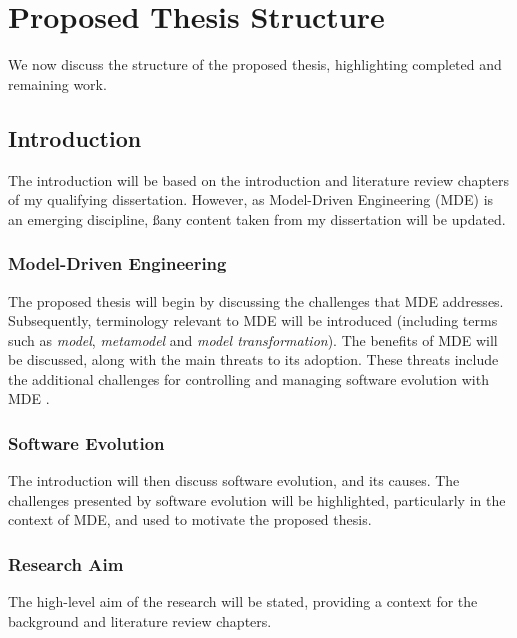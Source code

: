 

\section{Proposed Thesis Structure}
We now discuss the structure of the proposed thesis, highlighting completed and remaining work.


\subsection{Introduction}
The introduction will be based on the introduction and literature review chapters of my qualifying dissertation. However, as Model-Driven Engineering (MDE) is an emerging discipline, ßany content taken from my dissertation will be updated.

\subsubsection{Model-Driven Engineering}
The proposed thesis will begin by discussing the challenges that MDE addresses. Subsequently, terminology relevant to MDE will be introduced (including terms such as \emph{model}, \emph{metamodel} and \emph{model transformation}). The benefits of MDE will be discussed, along with the main threats to its adoption. These threats include the additional challenges for controlling and managing software evolution with MDE \cite{mens07softwareevolution}.

\subsubsection{Software Evolution}
The introduction will then discuss software evolution, and its causes. The challenges presented by software evolution will be highlighted, particularly in the context of MDE, and used to motivate the proposed thesis.

\subsubsection{Research Aim}
The high-level aim of the research will be stated, providing a context for the background and literature review chapters. 

